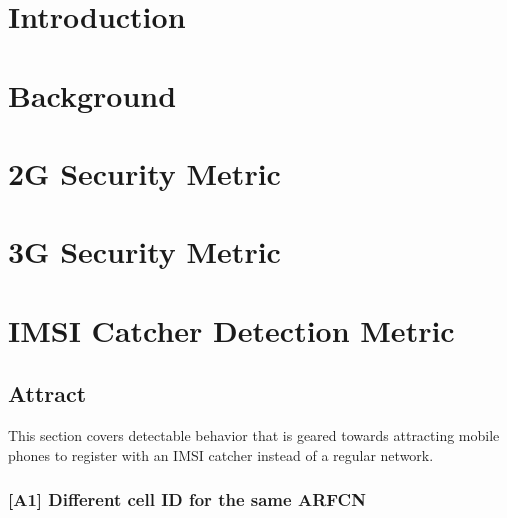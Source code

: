 \documentclass[a4paper,11pt,notitlepage,bigheadings,oneside]{scrartcl}
\begin{document}
\newcommand{\TBD}{{\color{srldark}\textbf{TBD}}}
\newcommand{\FIXME}[1]{{\color{srldark}\textit{TODO: #1}\par}}

\maketitle
\pagebreak

\tableofcontents
\pagebreak

\section{Introduction}
\label{sec:introduction}

\section{Background}
\label{sec:background}



\section{2G Security Metric}
\label{sec:2g_security_metric}

\section{3G Security Metric}
\label{sec:3g_security_metric}

\section{IMSI Catcher Detection Metric}
\label{sec:imsi_catcher_detection_metric}

\subsection{Attract}

This section covers detectable behavior that is geared towards attracting
mobile phones to register with an IMSI catcher instead of a regular network.

\subsubsection{[A1] Different cell ID for the same ARFCN}
\end{document}

